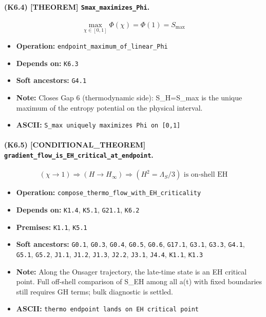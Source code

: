 \documentclass[11pt,a4paper]{article}
\theoremstyle{remark}\newtheorem*{caution}{Caution}
\newcommand{\tagbox}[1]{\textsc{[#1]}}
\begin{document}
\paragraph{(K6.4) \tagbox{THEOREM} \texttt{Smax\_maximizes\_Phi}.}
\begin{equation}
\max_{\chi\in[0,1]}\Phi(\chi)=\Phi(1)=S_{\max}
\tag{K6.4}
\end{equation}
\begin{itemize}\setlength{\itemsep}{0.12em}
\item \textbf{Operation:} \texttt{endpoint\_maximum\_of\_linear\_Phi}
\item \textbf{Depends on:} \texttt{K6.3}
\item \textbf{Soft ancestors:} \texttt{G4.1}
\item \textbf{Note:} Closes Gap 6 (thermodynamic side): S\_H=S\_max is the unique maximum of the entropy potential on the physical interval.
\item \textbf{ASCII:} \texttt{S\_max uniquely maximizes Phi on [0,1]}
\end{itemize}
\paragraph{(K6.5) \tagbox{CONDITIONAL\_THEOREM} \texttt{gradient\_flow\_is\_EH\_critical\_at\_endpoint}.}
\begin{equation}
(\chi\to 1)\Rightarrow(H\to H_\infty)\Rightarrow(H^2=\Lambda_S/3)\text{ is on-shell EH}
\tag{K6.5}
\end{equation}
\begin{itemize}\setlength{\itemsep}{0.12em}
\item \textbf{Operation:} \texttt{compose\_thermo\_flow\_with\_EH\_criticality}
\item \textbf{Depends on:} \texttt{K1.4}, \texttt{K5.1}, \texttt{G21.1}, \texttt{K6.2}
\item \textbf{Premises:} \texttt{K1.1}, \texttt{K5.1}
\item \textbf{Soft ancestors:} \texttt{G0.1}, \texttt{G0.3}, \texttt{G0.4}, \texttt{G0.5}, \texttt{G0.6}, \texttt{G17.1}, \texttt{G3.1}, \texttt{G3.3}, \texttt{G4.1}, \texttt{G5.1}, \texttt{G5.2}, \texttt{J1.1}, \texttt{J1.2}, \texttt{J1.3}, \texttt{J2.2}, \texttt{J3.1}, \texttt{J4.4}, \texttt{K1.1}, \texttt{K1.3}
\item \textbf{Note:} Along the Onsager trajectory, the late-time state is an EH critical point. Full off-shell comparison of S\_EH among all a(t) with fixed boundaries still requires GH terms; bulk diagnostic is settled.
\item \textbf{ASCII:} \texttt{thermo endpoint lands on EH critical point}
\end{itemize}
\end{document}
